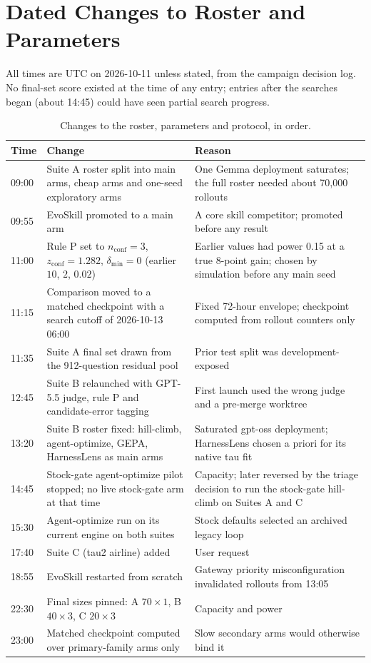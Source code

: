 \section{Dated Changes to Roster and Parameters}
\label{app:changelog}

All times are UTC on 2026-10-11 unless stated, from the campaign decision log. No final-set score existed at the time of any entry; entries after the searches began (about 14:45) could have seen partial search progress.

\begin{table}[h]
\caption{Changes to the roster, parameters and protocol, in order.}
\label{tab:changelog}
\centering\small
\begin{tabularx}{\textwidth}{@{}l X X@{}}
\toprule
Time & Change & Reason \\
\midrule
09:00 & Suite A roster split into main arms, cheap arms and one-seed exploratory arms & One Gemma deployment saturates; the full roster needed about 70{,}000 rollouts \\
09:55 & EvoSkill promoted to a main arm & A core skill competitor; promoted before any result \\
11:00 & Rule P set to $n_{\mathrm{conf}}=3$, $z_{\mathrm{conf}}=1.282$, $\delta_{\min}=0$ (earlier $10$, $2$, $0.02$) & Earlier values had power 0.15 at a true 8-point gain; chosen by simulation before any main seed \\
11:15 & Comparison moved to a matched checkpoint with a search cutoff of 2026-10-13 06:00 & Fixed 72-hour envelope; checkpoint computed from rollout counters only \\
11:35 & Suite A final set drawn from the 912-question residual pool & Prior test split was development-exposed \\
12:45 & Suite B relaunched with GPT-5.5 judge, rule P and candidate-error tagging & First launch used the wrong judge and a pre-merge worktree \\
13:20 & Suite B roster fixed: hill-climb, agent-optimize, GEPA, HarnessLens as main arms & Saturated gpt-oss deployment; HarnessLens chosen a priori for its native tau fit \\
14:45 & Stock-gate agent-optimize pilot stopped; no live stock-gate arm at that time & Capacity; later reversed by the triage decision to run the stock-gate hill-climb on Suites A and C \\
15:30 & Agent-optimize run on its current engine on both suites & Stock defaults selected an archived legacy loop \\
17:40 & Suite C (tau2 airline) added & User request \\
18:55 & EvoSkill restarted from scratch & Gateway priority misconfiguration invalidated rollouts from 13:05 \\
22:30 & Final sizes pinned: A $70\times 1$, B $40\times 3$, C $20\times 3$ & Capacity and power \\
23:00 & Matched checkpoint computed over primary-family arms only & Slow secondary arms would otherwise bind it \\
\bottomrule
\end{tabularx}
\end{table}

